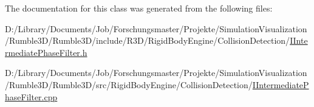 The documentation for this class was generated from the following files\+:\begin{DoxyCompactItemize}
\item 
D\+:/\+Library/\+Documents/\+Job/\+Forschungsmaster/\+Projekte/\+Simulation\+Visualization/\+Rumble3\+D/\+Rumble3\+D/include/\+R3\+D/\+Rigid\+Body\+Engine/\+Collision\+Detection/\mbox{\hyperlink{_i_intermediate_phase_filter_8h}{I\+Intermediate\+Phase\+Filter.\+h}}\item 
D\+:/\+Library/\+Documents/\+Job/\+Forschungsmaster/\+Projekte/\+Simulation\+Visualization/\+Rumble3\+D/\+Rumble3\+D/src/\+Rigid\+Body\+Engine/\+Collision\+Detection/\mbox{\hyperlink{_i_intermediate_phase_filter_8cpp}{I\+Intermediate\+Phase\+Filter.\+cpp}}\end{DoxyCompactItemize}
